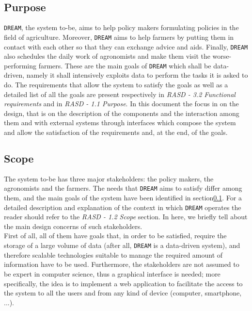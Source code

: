 \documentclass{article}
\begin{document}
\subsection{Purpose}\label{Purpose}
\verb|DREAM|, the system to-be, aims to help policy makers 
formulating policies in the field of agriculture.  Moreover, \verb|DREAM| aims to help farmers by putting them in contact with each other so that they can exchange advice and aids. Finally, \verb|DREAM| also schedules the daily work of agronomists and make them visit the worse-performing farmers. These are the main goals of \verb|DREAM| which shall be data-driven, namely it shall intensively exploits data to perform the tasks it is asked to do. The requirements that allow the system to satisfy the goals as well as a detailed list of all the goals are present respectively in \textit{RASD - 3.2 Functional requirements} and in \textit{RASD - 1.1 Purpose}. In this document the focus in on the design, that is on the description of the components and the interaction among them and with external systems through interfaces which compose the system and allow the satisfaction of the requirements and, at the end, of the goals.
\subsection{Scope}
The system to-be has three major stakeholders: the policy makers, the agronomists and the farmers. The needs that \verb|DREAM| aims to satisfy differ among them, and the main goals of the system have been identified in section\ref{Purpose}. For a detailed description and explanation of the context in which \verb|DREAM| operates the reader should refer to the \textit{RASD - 1.2 Scope} section. In here, we briefly tell about the main design concerns of such stakeholders.\\
First of all, all of them have goals that, in order to be satisfied, require the storage of a large volume of data (after all, \verb|DREAM| is a data-driven system), and therefore scalable technologies suitable to manage the required amount of information have to be used. Furthermore, the stakeholders are not assumed to be expert in computer science, thus a graphical interface is needed; more specifically, the idea is to implement a web application to facilitate the access to the system to all the users and from any kind of device (computer, smartphone, ...).
\end{document}
